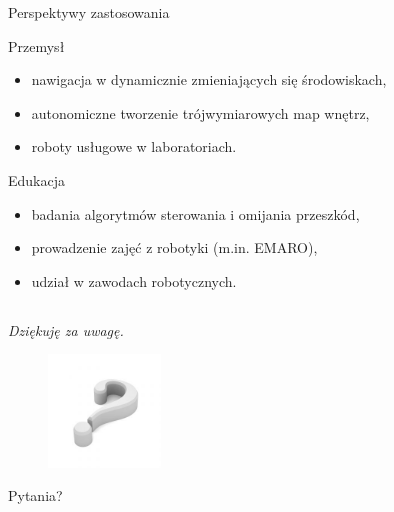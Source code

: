 \documentclass[xcolor=x11names,compress]{beamer}
\renewcommand{\(}{\begin{columns}}
\renewcommand{\)}{\end{columns}}
\newcommand{\<}[1]{\begin{column}{#1}}
\renewcommand{\>}{\end{column}}
\begin{document}
\begin{frame}{Perspektywy zastosowania}

    \alert{Przemysł}
    \begin{itemize}
    \item nawigacja w dynamicznie zmieniających się środowiskach,
    \item autonomiczne tworzenie trójwymiarowych map wnętrz,
    \item roboty usługowe w laboratoriach.
    \end{itemize}

    \vspace{.4cm}
    \pause

    \alert{Edukacja}
    \begin{itemize}
    \item badania algorytmów sterowania i omijania przeszkód,
    \item prowadzenie zajęć z robotyki (m.in. EMARO),
    \item udział w zawodach robotycznych.
    \end{itemize}

\end{frame}


\subsection*{}
\begin{frame}{}

\it
\Large{Dziękuję za uwagę.}

\begin{figure}[h!]
\centering
\includegraphics[width=3cm]{img/qmark}
\end{figure}

\hfill\Large{Pytania?}

\end{frame}





\end{document}
